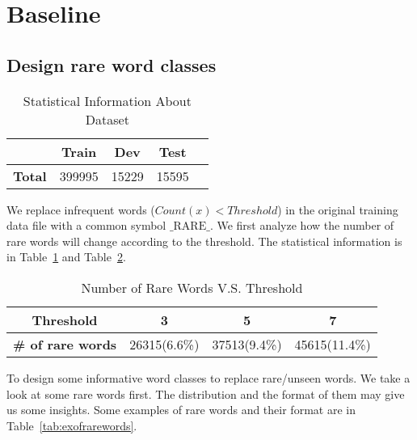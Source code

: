 \section{\textbf{Baseline}}


\subsection{\textbf{Design rare word classes}}

\begin{table}[ht]  %
\centering  %
\caption{Statistical Information About Dataset}
\begin{tabular}{lcccc}
\hline
&    \textbf{Train} & \textbf{Dev} & \textbf{Test} \\
\hline
 \textbf{Total} & 399995 & 15229 & 15595 \\
\hline
\end{tabular}
\label{tab:stat}
\end{table}

We replace infrequent words ($Count(x)<Threshold$) in the original training data file with a common symbol $\text{\_RARE\_}$. We first analyze how the number of rare words will change according to the threshold. The statistical information is in Table~\ref{tab:stat} and Table~\ref{tab:numberofrarewords}.

\begin{table}[ht]  %
\centering  %
\caption{Number of Rare Words V.S. Threshold}
\begin{tabular}{cccc}
\hline
\textbf{Threshold} &    \textbf{3} & \textbf{5} & \textbf{7} \\
\hline
 \textbf{\# of rare words} & 26315(6.6\%) & 37513(9.4\%) & 45615(11.4\%) \\
\hline
\end{tabular}
\label{tab:numberofrarewords}
\end{table}

To design some informative word classes to replace rare/unseen words. We take a look at some rare words first. The distribution and the format of them may give us some insights. Some examples of rare words and their format are in Table~\ref{tab:exofrarewords}.

